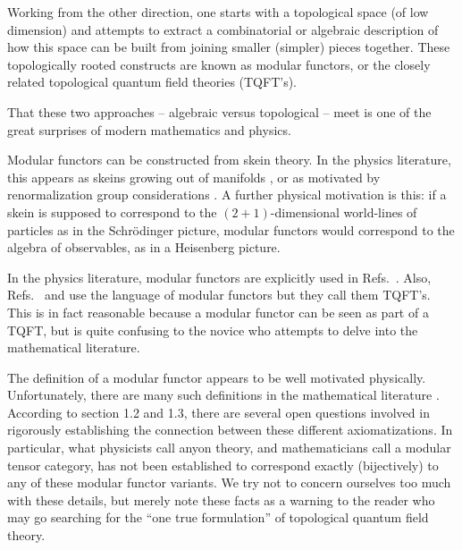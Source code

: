 Working from the other direction, one starts with
a topological space (of low dimension) and attempts
to extract a combinatorial or algebraic description of how this
space can be built from joining smaller (simpler) pieces together.
These topologically rooted constructs are known as modular functors, 
or the closely related topological quantum field theories (TQFT's).

That these two approaches -- algebraic versus topological -- meet is one of the great
surprises of modern mathematics and physics.


Modular functors can be constructed from skein theory.
In the physics literature, 
this appears as skeins growing out of manifolds \cite{Pfeifer2012},
or as motivated by renormalization group considerations \cite{Levin2005}.
A further physical motivation is this: if a skein 
is supposed to correspond to the $(2+1)$-dimensional
world-lines of particles
as in the Schr\"{o}dinger picture,
modular functors would
correspond to the algebra of observables, as in
a Heisenberg picture.

In the physics literature, modular functors are
explicitly used in Refs.~\cite{Freedman2002, Freedman2002simulation}.
Also, Refs.~\cite{Beverland2014} and \cite{Kitaev2006topo}
use the language of modular functors but they call them TQFT's.
This is in fact reasonable because a modular functor can be
seen as part of a TQFT, but is quite confusing to the
novice who attempts to delve into the mathematical literature.

The definition of a modular functor appears to
be well motivated physically.
Unfortunately, there are many such definitions
in the mathematical literature 
\cite{Walker1991,Turaev1994,Bakalov2001,Tillmann1998}.
According to \cite{Bartlett2015} section 1.2 and 1.3,
there are several open questions involved in 
rigorously establishing the connection between these different axiomatizations.
In particular, what physicists call anyon theory,
and mathematicians call a modular tensor category,
has not been established to correspond exactly
(bijectively) to any of these modular functor variants. 
We try not to concern ourselves too much with these details, 
but merely note these facts as a warning to the reader
who may go searching for the ``one true formulation'' of
topological quantum field theory.

